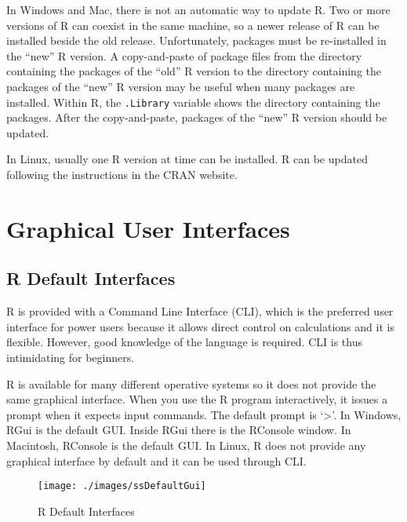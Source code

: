 \documentclass[]{book}
\begin{document}
In Windows and Mac, there is not an automatic way to update R. Two or
more versions of R can coexist in the same machine, so a newer release
of R can be installed beside the old release. Unfortunately, packages
must be re-installed in the ``new'' R version. A copy-and-paste of
package files from the directory containing the packages of the ``old''
R version to the directory containing the packages of the ``new'' R
version may be useful when many packages are installed. Within R, the
\texttt{.Library} variable shows the directory containing the packages.
After the copy-and-paste, packages of the ``new'' R version should be
updated.

In Linux, usually one R version at time can be installed. R can be
updated following the instructions in the CRAN website.

\section{Graphical User Interfaces}\label{graphical-user-interfaces}

\subsection{R Default Interfaces}\label{r-default-interfaces}

R is provided with a Command Line Interface (CLI), which is the
preferred user interface for power users because it allows direct
control on calculations and it is flexible. However, good knowledge of
the language is required. CLI is thus intimidating for beginners.

R is available for many different operative systems so it does not
provide the same graphical interface. When you use the R program
interactively, it issues a prompt when it expects input commands. The
default prompt is `\textgreater{}'. In Windows, RGui is the default GUI.
Inside RGui there is the RConsole window. In Macintosh, RConsole is the
default GUI. In Linux, R does not provide any graphical interface by
default and it can be used through CLI.

\begin{figure}[h]

{\centering \texttt{[image: ./images/ssDefaultGui]} 

}

\caption{R Default Interfaces}\label{fig:g3}
\end{figure}

\clearpage
\end{document}
